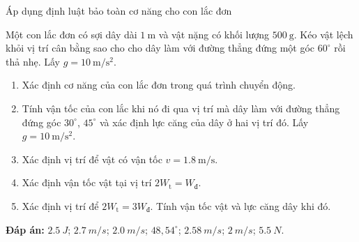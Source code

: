 \begin{dang}{Áp dụng định luật bảo toàn cơ năng cho con lắc đơn}
{		Một con lắc đơn có sợi dây dài $\SI{1}{\meter}$ và vật nặng có khối lượng $\SI{500}{\gram}$. Kéo vật lệch khỏi vị trí cân bằng sao cho cho dây làm với đường thẳng đứng một góc $60^\circ$ rồi thả nhẹ. Lấy $g= \SI{10}{\meter/\second^2}$.
		\begin{enumerate}[label=\alph*)]
			\item Xác định cơ năng của con lắc đơn trong quá trình chuyển động.
			\item Tính vận tốc của con lắc khi nó đi qua vị trí mà dây làm với đường thẳng đứng góc $30^\circ$, $45^\circ$ và xác định lực căng của dây ở hai vị trí đó. Lấy $g= \SI{10}{\meter/\second^2}$.
			\item Xác định vị trí để vật có vận tốc $v=\SI{1,8}{\meter/\second}$.
			\item Xác định vận tốc vật tại vị trí $2W_\text{t}=W_\text{đ}$.
			\item Xác định vị trí để $2W_\text{t}=3W_\text{đ}$. Tính vận tốc vật và lực căng dây khi đó.
		\end{enumerate}
		
		\textbf{Đáp án:} $\SI{2.5}{J}$; $\SI{2.7}{m/s}$; $\SI{2.0}{m/s}$; $48,54^\circ$; $\SI{2.58}{m/s}$; $\SI{2}{m/s}$; $\SI{5.5}{N}$.
	}
\end{dang}

